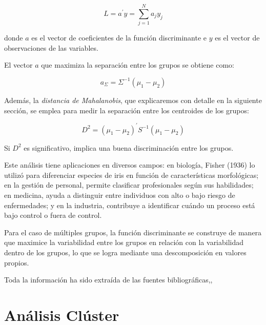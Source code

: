 \[
L = a^{'}y = \sum_{j=1}^{N} a_{j}y_{j}
\]

donde $a$ es el vector de coeficientes de la función discriminante e $y$ es el vector de observaciones de las variables. \newline

El vector $a$ que maximiza la separación entre los grupos se obtiene como:

\[
a_{\Sigma} = \Sigma^{-1}(\mu_{1}-\mu_{2})
\]

Además, la \textit{distancia de Mahalanobis}, que explicaremos con detalle en la siguiente sección, se emplea para medir la separación entre
los centroides de los grupos:

\[
D^{2} = (\mu_{1}-\mu_{2})^{'}S^{-1}(\mu_{1}-\mu_{2})
\]

Si $D^{2}$ es significativo, implica una buena discriminación entre los grupos. \newline

Este análisis tiene aplicaciones en diversos campos: en biología, Fisher (1936) lo utilizó para diferenciar especies de iris en función de
características morfológicas; en la gestión de personal, permite clasificar profesionales según sus habilidades; en medicina, ayuda a distinguir
entre individuos con alto o bajo riesgo de enfermedades; y en la industria, contribuye a identificar cuándo un proceso está bajo control o fuera 
de control. \newline

Para el caso de múltiples grupos, la función discriminante se construye de manera que maximice la variabilidad entre los grupos en relación con 
la variabilidad dentro de los grupos, lo que se logra mediante una descomposición en valores propios. \newline

Toda la información ha sido extraída de las fuentes bibliográficas\cite{bejar-PCA},\cite{bejar-AF}\cite{Bib-5},\cite{Bib-6} %

\section{Análisis Clúster}
